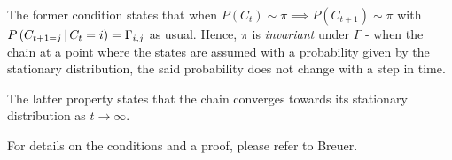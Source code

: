 The former condition states that when $P(C_t) \sim \pi \implies P(C_{t+1}) \sim \pi$ with $P\left(C_{t+1 = j} \, | \, C_t = i\right) = \Gamma_{i, j}$ as usual. Hence, $\pi$ is \textit{invariant} under $\Gamma$ - when the chain at a point where the states are assumed with a probability given by the stationary distribution, the said probability does not change with a step in time. 

The latter property states that the chain converges towards its stationary distribution as $t \rightarrow \infty$. 

For details on the conditions and a proof, please refer to Breuer\cite{intro_processes}.
